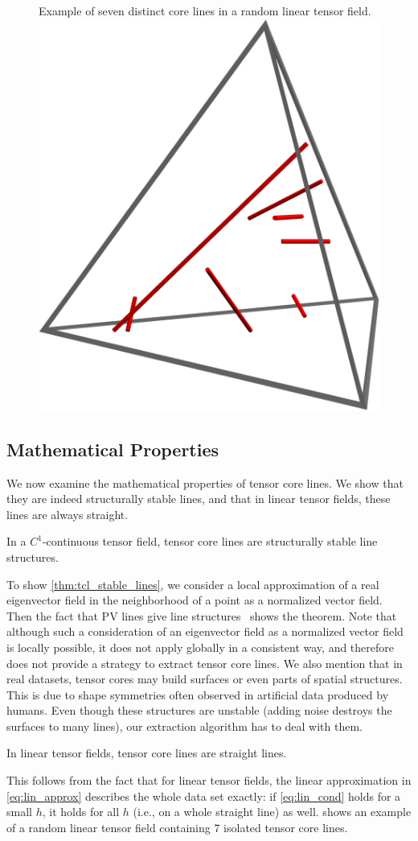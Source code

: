 \begin{figure}
    \begin{captionbeside}
        {Example of seven distinct core lines in a random linear tensor field.
        \label{fig:7lines}}
        \includegraphics[width=0.5\columnwidth]{figures/7lines}
    \end{captionbeside}
\end{figure}
%

\subsection{Mathematical Properties} %
\label{sub:mathematical_properties}
%
We now examine the mathematical properties of tensor core lines.
%
We show that they are indeed structurally stable lines, and that in linear
tensor fields, these lines are always straight.
%

%
\begin{theorem}\label{thm:tcl_stable_lines}
In a $C^1$-continuous tensor field, tensor core lines are
structurally stable line structures.
\end{theorem}
%
To show \cref{thm:tcl_stable_lines}, we consider a local approximation of a real
eigenvector field in the neighborhood of a point as a normalized vector field.
%
Then the fact that \ac{PV} lines give line structures~\cite{Peikert1999} shows
the theorem.
%
Note that although such a consideration of an eigenvector field as a normalized
vector field is locally possible, it does not apply globally in a consistent
way, and therefore does not provide a strategy to extract tensor core lines.
%
We also mention that in real datasets, tensor cores may build surfaces or even
parts of spatial structures.
%
This is due to shape symmetries often observed in artificial data produced by
humans.
%
Even though these structures are unstable (adding noise destroys the surfaces to
many lines), our extraction algorithm has to deal with them.
%

%
\begin{theorem}
In linear tensor fields, tensor core lines are straight lines.
\end{theorem}
%
This follows from the fact that for linear tensor fields, the linear
approximation in \eqref{eq:lin_approx} describes the whole data set
exactly: if \eqref{eq:lin_cond} holds for a small $h$, it holds for all
$h$ (i.e., on a whole straight line) as well.
%
 shows an example of a random linear tensor field containing
7 isolated tensor core lines.
%

